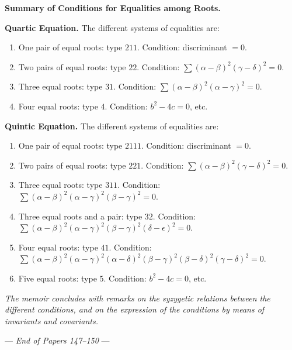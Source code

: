 \documentclass[11pt,a4paper]{book}
\begin{document}
\begin{center}
\newpage
\begin{center}
\textbf{Summary of Conditions for Equalities among Roots.}
\end{center}

\textbf{Quartic Equation.} The different systems of equalities are:
\begin{enumerate}[label=(\roman*)]
\item One pair of equal roots: type $211$. Condition: discriminant $= 0$.
\item Two pairs of equal roots: type $22$. Condition:
  $\sum (\alpha - \beta)^2 (\gamma - \delta)^2 = 0$.
\item Three equal roots: type $31$. Condition:
  $\sum (\alpha - \beta)^2 (\alpha - \gamma)^2 = 0$.
\item Four equal roots: type $4$. Condition: $b^2 - 4c = 0$, etc.
\end{enumerate}

\textbf{Quintic Equation.} The different systems of equalities are:
\begin{enumerate}[label=(\roman*)]
\item One pair of equal roots: type $2111$. Condition: discriminant $= 0$.
\item Two pairs of equal roots: type $221$. Condition:
  $\sum (\alpha - \beta)^2 (\gamma - \delta)^2 = 0$.
\item Three equal roots: type $311$. Condition:
  $\sum (\alpha - \beta)^2 (\alpha - \gamma)^2 (\beta - \gamma)^2 = 0$.
\item Three equal roots and a pair: type $32$. Condition:
  $\sum (\alpha - \beta)^2 (\alpha - \gamma)^2 (\beta - \gamma)^2
   (\delta - \epsilon)^2 = 0$.
\item Four equal roots: type $41$. Condition:
  $\sum (\alpha - \beta)^2 (\alpha - \gamma)^2 (\alpha - \delta)^2
   (\beta - \gamma)^2 (\beta - \delta)^2 (\gamma - \delta)^2 = 0$.
\item Five equal roots: type $5$. Condition: $b^2 - 4c = 0$, etc.
\end{enumerate}

\textit{The memoir concludes with remarks on the syzygetic relations between
the different conditions, and on the expression of the conditions by means of
invariants and covariants.}

\vfill
\begin{center}
--- \textit{End of Papers 147--150} ---
\end{center}
\clearpage


\thispagestyle{empty}



\end{center}
\end{document}
